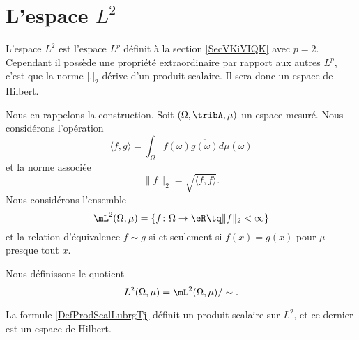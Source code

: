 \section{L'espace \texorpdfstring{$L^2$}{$L^2$}}
\label{SECooEVZSooLtLhUm}

L'espace \( L^2\) est l'espace \( L^p\) définit à la section \ref{SecVKiVIQK} avec \( p=2\). Cependant il possède une propriété extraordinaire par rapport aux autres \( L^p\), c'est que la norme \( | . |_2\) dérive d'un produit scalaire. Il sera donc un espace de Hilbert.

Nous en rappelons la construction. Soit \( (\Omega,\tribA,\mu)\) un espace mesuré. Nous considérons l'opération
\begin{equation}    \label{DefProdScalLubrgTj}
    \langle f, g\rangle =\int_{\Omega}f(\omega)\overline{ g(\omega)}d\mu(\omega)
\end{equation}
et la norme associée
\begin{equation}
    \| f \|_2=\sqrt{\langle f, f\rangle }.
\end{equation}
Nous considérons l'ensemble
\begin{equation}
    \mL^2(\Omega,\mu)=\{ f\colon \Omega\to \eR\tq \| f \|_2<\infty \}
\end{equation}
et la relation d'équivalence \( f\sim g\) si et seulement si \( f(x)=g(x)\) pour \( \mu\)-presque tout \( x\).

\begin{definition}      \label{DEFooSVCHooIwwuIx}
    Nous définissons le quotient
    \begin{equation}
        L^2(\Omega,\mu)=\mL^2(\Omega,\mu)/\sim.
    \end{equation}
\end{definition}

\begin{lemma}   \label{LemIVWooZyWodb}
    La formule \eqref{DefProdScalLubrgTj} définit un produit scalaire sur \( L^2\), et ce dernier est un espace de Hilbert.
\end{lemma}


